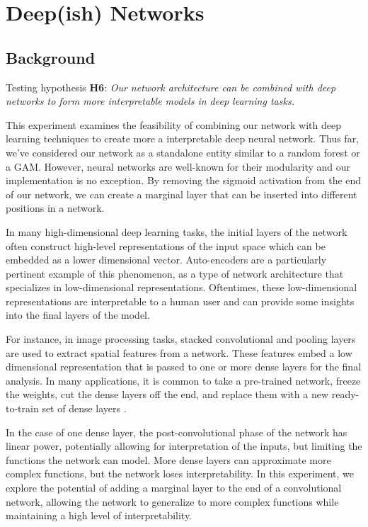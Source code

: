 
\section{Deep(ish) Networks}

\subsection{Background}

Testing hypothesis \textbf{H6}: \textit{Our network architecture can be combined with deep networks to form more interpretable models in deep learning tasks.}

This experiment examines the feasibility of combining our network with deep learning techniques to create more a interpretable deep neural network. Thus far, we've considered our network as a standalone entity similar to a random forest or a GAM. However, neural networks are well-known for their modularity and our implementation is no exception. By removing the sigmoid activation from the end of our network, we can create a marginal layer that can be inserted into different positions in a network. 

In many high-dimensional deep learning tasks, the initial layers of the network often construct high-level representations of the input space which can be embedded as a lower dimensional vector. Auto-encoders \citep{Baldi2012AutoencodersArchitectures} are a particularly pertinent example of this phenomenon, as a type of network architecture that specializes in low-dimensional representations. Oftentimes, these low-dimensional representations are interpretable to a human user and can provide some insights into the final layers of the model.

For instance, in image processing tasks, stacked convolutional and pooling layers are used to extract spatial features from a network. These features embed a low dimensional representation that is passed to one or more dense layers for the final analysis. In many applications, it is common to take a pre-trained network, freeze the weights, cut the dense layers off the end, and replace them with a new ready-to-train set of dense layers \citep{Pelka2018AnnotationNetworks}. 

In the case of one dense layer, the post-convolutional phase of the network has linear power, potentially allowing for interpretation of the inputs, but limiting the functions the network can model. More dense layers can approximate more complex functions, but the network loses interpretability. In this experiment, we explore the potential of adding a marginal layer to the end of a convolutional network, allowing the network to generalize to more complex functions while maintaining a high level of interpretability. 


